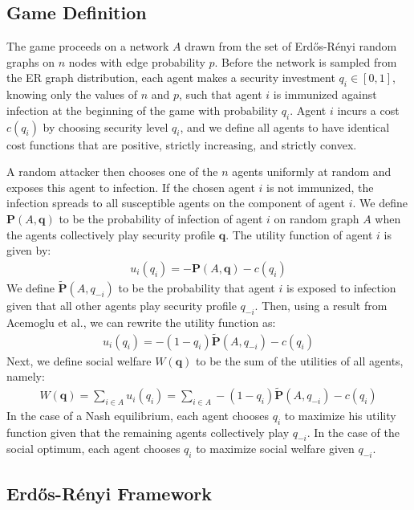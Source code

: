 \documentclass{article}
\theoremstyle{plain}
\begin{document}
\subsection{Game Definition}

The game proceeds on a network $A$ drawn from the set of Erd\H{o}s-R\'{e}nyi random graphs on $n$ nodes with edge probability $p$. Before the network is sampled from the ER graph distribution, each agent makes a security investment $q_i \in [0, 1]$, knowing only the values of $n$ and $p$, such that agent $i$ is immunized against infection at the beginning of the game with probability $q_i$. Agent $i$ incurs a cost $c(q_i)$ by choosing security level $q_i$, and we define all agents to have identical cost functions that are positive, strictly increasing, and strictly convex. 

A random attacker then chooses one of the $n$ agents uniformly at random and exposes this agent to infection. If the chosen agent $i$ is not immunized, the infection spreads to all susceptible agents on the component of agent $i$. We define $\textbf{P}(A, \textbf{q})$ to be the probability of infection of agent $i$ on random graph $A$ when the agents collectively play security profile $\textbf{q}$. The utility function of agent $i$ is given by:
\begin{eqnarray}
	u_i(q_i) = -\textbf{P}(A, \textbf{q}) - c(q_i)
\end{eqnarray} 
We define $\tilde{\textbf{P}}(A,q_{-i})$ to be the probability that agent $i$ is exposed to infection given that all other agents play security profile $q_{-i}$. Then, using a result from Acemoglu et al., we can rewrite the utility function as:
\begin{eqnarray}
	u_i(q_i) = -(1-q_{i})\tilde{\textbf{P}}(A,q_{-i}) - c(q_i)
\end{eqnarray}
Next, we define social welfare $W(\textbf{q})$ to be the sum of the utilities of all agents, namely:
\begin{eqnarray}
	W(\textbf{q}) = \sum\limits_{i \in A} u_i(q_i) = \sum\limits_{i \in A}  -(1-q_{i})\tilde{\textbf{P}}(A,q_{-i}) - c(q_i)
\end{eqnarray}
In the case of a Nash equilibrium, each agent chooses $q_i$ to maximize his utility function given that the remaining agents collectively play $q_{-i}$. In the case of the social optimum, each agent chooses $q_i$ to maximize social welfare given $q_{-i}$.

\subsection{Erd\H{o}s-R\'{e}nyi Framework}
\end{document}
